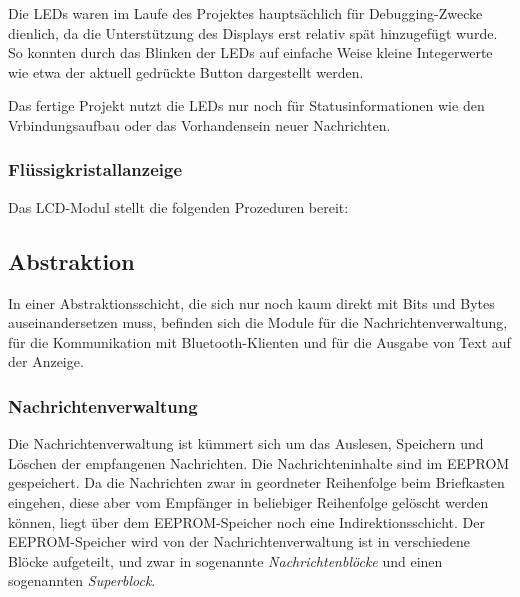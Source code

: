 \documentclass[ngerman]{article}
\begin{document}
Die LEDs waren im Laufe des Projektes hauptsächlich für Debugging-Zwecke
dienlich, da die Unterstützung des Displays erst relativ spät hinzugefügt
wurde. So konnten durch das Blinken der LEDs auf einfache Weise kleine
Integerwerte wie etwa der aktuell gedrückte Button dargestellt werden.

Das fertige Projekt nutzt die LEDs nur noch für Statusinformationen
wie den Vrbindungsaufbau oder das Vorhandensein neuer Nachrichten.

\subsubsection{Flüssigkristallanzeige}

Das LCD-Modul stellt die folgenden Prozeduren bereit:




\subsection{Abstraktion}

In einer Abstraktionsschicht, die sich nur noch kaum direkt mit Bits und Bytes
auseinandersetzen muss, befinden sich die Module für die Nachrichtenverwaltung,
für die Kommunikation mit Bluetooth-Klienten und für die Ausgabe von Text auf
der Anzeige.


\subsubsection{Nachrichtenverwaltung}

Die Nachrichtenverwaltung ist kümmert sich um das Auslesen, Speichern und
Löschen der empfangenen Nachrichten. Die Nachrichteninhalte sind im EEPROM
gespeichert.  Da die Nachrichten zwar in geordneter Reihenfolge beim
Briefkasten eingehen, diese aber vom Empfänger in beliebiger Reihenfolge
gelöscht werden können, liegt über dem EEPROM-Speicher noch eine
In\-di\-rek\-tions\-schicht. Der EEPROM-Speicher wird von der
Nachrichtenverwaltung ist in verschiedene Blöcke aufgeteilt, und zwar in
sogenannte \textit{Nachrichtenblöcke} und einen sogenannten
\textit{Superblock}.

\end{document}
